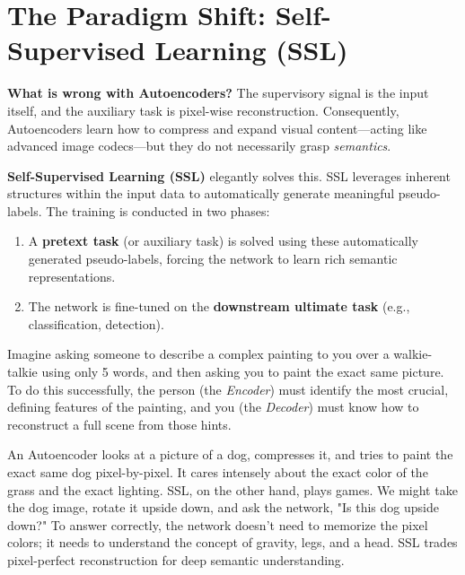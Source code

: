 \section{The Paradigm Shift: Self-Supervised Learning (SSL)}
\label{sec:ssl}

\textbf{What is wrong with Autoencoders?} The supervisory signal is the input itself, and the auxiliary task is pixel-wise reconstruction. Consequently, Autoencoders learn how to compress and expand visual content—acting like advanced image codecs—but they do not necessarily grasp \textit{semantics}.

\textbf{Self-Supervised Learning (SSL)} elegantly solves this. SSL leverages inherent structures within the input data to automatically generate meaningful pseudo-labels. The training is conducted in two phases:
\begin{enumerate}
    \item A \textbf{pretext task} (or auxiliary task) is solved using these automatically generated pseudo-labels, forcing the network to learn rich semantic representations.
    \item The network is fine-tuned on the \textbf{downstream ultimate task} (e.g., classification, detection).
\end{enumerate}

\begin{insightbox}
Imagine asking someone to describe a complex painting to you over a walkie-talkie using only 5 words, and then asking you to paint the exact same picture. To do this successfully, the person (the \textit{Encoder}) must identify the most crucial, defining features of the painting, and you (the \textit{Decoder}) must know how to reconstruct a full scene from those hints. 
\end{insightbox}
\begin{insightbox}
An Autoencoder looks at a picture of a dog, compresses it, and tries to paint the exact same dog pixel-by-pixel. It cares intensely about the exact color of the grass and the exact lighting. SSL, on the other hand, plays games. We might take the dog image, rotate it upside down, and ask the network, "Is this dog upside down?" To answer correctly, the network doesn't need to memorize the pixel colors; it needs to understand the concept of gravity, legs, and a head. SSL trades pixel-perfect reconstruction for deep semantic understanding.
\end{insightbox}

